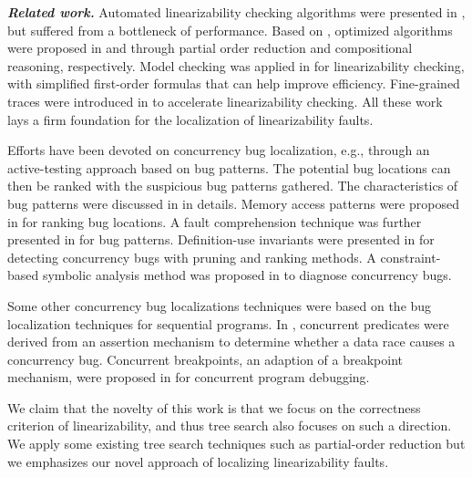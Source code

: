 \documentclass[runningheads]{llncs}
\begin{document}
\noindent\textbf{\textit{Related work.}} Automated linearizability checking algorithms were presented in \cite{DBLP:conf/pldi/BurckhardtDMT10,DBLP:journals/jpdc/WingG93}, but suffered from a bottleneck of performance. Based on \cite{DBLP:journals/jpdc/WingG93}, optimized algorithms were proposed in \cite{DBLP:journals/concurrency/Lowe17} and \cite{DBLP:conf/forte/HornK15a} through partial order reduction and compositional reasoning, respectively. Model checking was applied in \cite{DBLP:conf/popl/BouajjaniEEH15,DBLP:conf/pldi/EmmiEH15} for linearizability checking, with simplified first-order formulas that can help improve efficiency. Fine-grained traces were introduced in \cite{DBLP:conf/sac/LongZ16} to accelerate linearizability checking. All these work lays a firm foundation for the localization of linearizability faults.

Efforts have been devoted on concurrency bug localization, e.g., through an active-testing approach based on bug patterns. The potential bug locations can then be ranked with the suspicious bug patterns gathered. The characteristics of bug patterns were discussed in \cite{DBLP:conf/asplos/LuPSZ08,DBLP:conf/ipps/FarchiNU03} in details. Memory access patterns were proposed in \cite{DBLP:conf/icse/ParkVH10,DBLP:conf/icst/ParkVH12,DBLP:conf/icsm/LiuQWM14} for ranking bug locations. A fault comprehension technique was further presented in \cite{DBLP:conf/icse/Park04} for bug patterns. Definition-use invariants were presented in \cite{DBLP:conf/oopsla/ShiPYLZCZ10} for detecting concurrency bugs with pruning and ranking methods. A constraint-based symbolic analysis method was proposed in \cite{DBLP:conf/issta/KhoshnoodKW15} to diagnose concurrency bugs.

Some other concurrency bug localizations techniques were based on the bug localization techniques for sequential programs. In \cite{DBLP:conf/IEEEpact/GottschlichPPW13}, concurrent predicates were derived from an assertion mechanism to determine whether a data race causes a concurrency bug. Concurrent breakpoints, an adaption of a breakpoint mechanism, were proposed in \cite{DBLP:conf/ppopp/ParkS12} for concurrent program debugging.

We claim that the novelty of this work is that we focus on the correctness criterion of linearizability, and thus tree search also focuses on such a direction. We apply some 
existing tree search techniques such as partial-order reduction but we emphasizes our novel approach of localizing linearizability faults.
\end{document}

